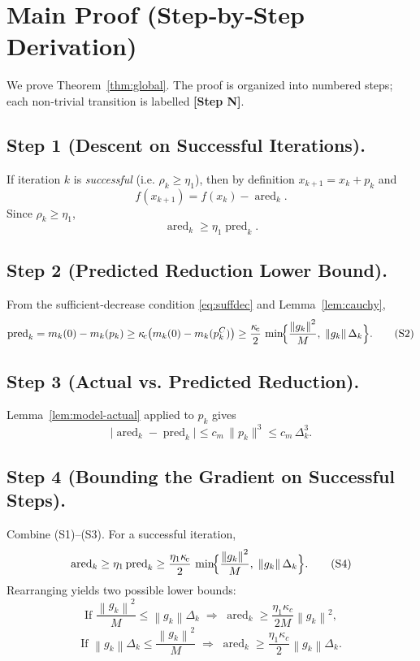 \documentclass{article}
\newcommand{\norm}[1]{\left\lVert #1\right\rVert}
\begin{document}
\section*{Main Proof (Step‑by‑Step Derivation)}
We prove Theorem~\ref{thm:global}. The proof is organized into numbered steps; each non‑trivial transition is labelled \textbf{[Step N]}.

\subsection*{Step 1 (Descent on Successful Iterations).}
If iteration $k$ is \emph{successful} (i.e. $\rho_{k}\ge\eta_{1}$), then by definition $x_{k+1}=x_{k}+p_{k}$ and
\[
f(x_{k+1}) = f(x_{k})-\operatorname{ared}_{k}.
\]
Since $\rho_{k}\ge\eta_{1}$,
\[
\operatorname{ared}_{k}\ge\eta_{1}\operatorname{pred}_{k}.
\tag{S1}
\]

\subsection*{Step 2 (Predicted Reduction Lower Bound).}
From the sufficient‑decrease condition \eqref{eq:suffdec} and Lemma~\ref{lem:cauchy},
\[
\operatorname{pred}_{k}=m_{k}(0)-m_{k}(p_{k})
\ge\kappa_{\!c}\bigl(m_{k}(0)-m_{k}(p^{C}_{k})\bigr)
\ge\frac{\kappa_{\!c}}{2}\,\min\!\Bigl\{\frac{\norm{g_{k}}^{2}}{M},\;\norm{g_{k}}\Delta_{k}\Bigr\}.
\tag{S2}
\]

\subsection*{Step 3 (Actual vs. Predicted Reduction).}
Lemma~\ref{lem:model-actual} applied to $p_{k}$ gives
\[
\bigl|\operatorname{ared}_{k}-\operatorname{pred}_{k}\bigr|
\le c_{m}\,\|p_{k}\|^{3}
\le c_{m}\,\Delta_{k}^{3}.
\tag{S3}
\]

\subsection*{Step 4 (Bounding the Gradient on Successful Steps).}
Combine (S1)–(S3). For a successful iteration,
\[
\operatorname{ared}_{k}
\ge\eta_{1}\operatorname{pred}_{k}
\ge\frac{\eta_{1}\kappa_{\!c}}{2}\,\min\!\Bigl\{\frac{\norm{g_{k}}^{2}}{M},\;\norm{g_{k}}\Delta_{k}\Bigr\}.
\tag{S4}
\]
Rearranging yields two possible lower bounds:
\[
\text{If }\frac{\norm{g_{k}}^{2}}{M}\le \norm{g_{k}}\Delta_{k}
\;\Longrightarrow\;
\operatorname{ared}_{k}\ge\frac{\eta_{1}\kappa_{\!c}}{2M}\norm{g_{k}}^{2},
\tag{S4a}
\]
\[
\text{If }\norm{g_{k}}\Delta_{k}\le\frac{\norm{g_{k}}^{2}}{M}
\;\Longrightarrow\;
\operatorname{ared}_{k}\ge\frac{\eta_{1}\kappa_{\!c}}{2}\norm{g_{k}}\Delta_{k}.
\tag{S4b}
\]
\end{document}
